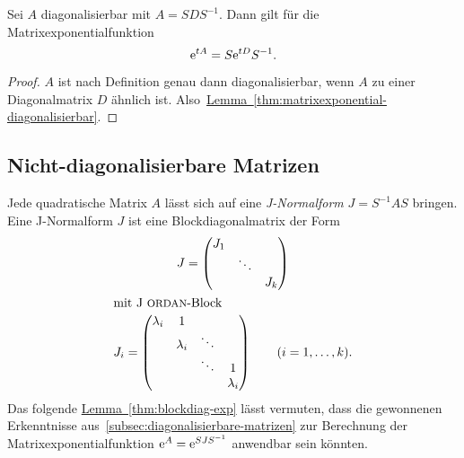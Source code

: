 \begin{corollary}
    Sei $A$ diagonalisierbar mit $A = S D S^{-1}$.
    Dann gilt für die Matrixexponentialfunktion
    \begin{equation*}
        \mathrm{e}^{t A} = S \mathrm{e}^{t D} S^{-1}.
    \end{equation*}
\end{corollary}

\begin{proof}
    $A$ ist nach Definition genau dann diagonalisierbar, wenn $A$ zu einer Diagonalmatrix $D$ ähnlich ist.
    Also~\hyperref[thm:matrixexponential-diagonalisierbar]{Lemma~\ref*{thm:matrixexponential-diagonalisierbar}}.
\end{proof}

\subsection{Nicht-diagonalisierbare Matrizen}\label{subsec:nichtdiagonalisierbare-matrizen}
Jede quadratische Matrix $A$ lässt sich auf eine \emph{J-Normalform} $J = S^{-1} A S$ bringen.
Eine J-Normalform $J$ ist eine Blockdiagonalmatrix der Form
\begin{gather*}
    J = \begin{pmatrix}
            J_1 &        &  \\
                & \ddots & \\
                &        & J_k
    \end{pmatrix}\\
    \intertext{mit J\textc{ordan}-Block}
    J_i = \begin{pmatrix}
              \lambda_i & 1         &        & \\
                        & \lambda_i & \ddots & \\
                        &           & \ddots & 1 \\
                        &           &        & \lambda_i
    \end{pmatrix}
    \qquad (i = 1,\dots,k).
\end{gather*}
Das folgende \hyperref[thm:blockdiag-exp]{Lemma~\ref*{thm:blockdiag-exp}} lässt vermuten,
dass die gewonnenen Erkenntnisse aus~\autoref{subsec:diagonalisierbare-matrizen} zur Berechnung der
Matrixexponentialfunktion $\mathrm{e}^{A} = \mathrm{e}^{S J S^{-1}}$ anwendbar sein könnten.

